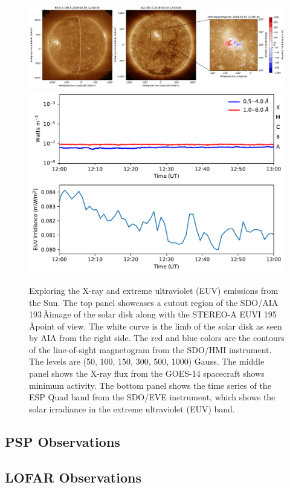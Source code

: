 \begin{figure}[ht]
\centering
\includegraphics[width=\hsize]{chapter2/figs/aia_sta_cutout.pdf}
\includegraphics[width=12cm]{chapter2/figs/xrs_eve.pdf}
\caption{Exploring the X-ray and extreme ultraviolet (EUV) emissions from the Sun. The top panel showcases a cutout region of the SDO/AIA 193\,\AA image of the solar disk along with the STEREO-A EUVI 195\,\AA point of view. The white curve is the limb of the solar disk as seen by AIA from the right side. The red and blue colors are the contours of the line-of-sight magnetogram from the SDO/HMI instrument. The levels are (50, 100, 150, 300, 500, 1000) Gauss. The middle panel shows the X-ray flux from the GOES-14 spacecraft shows minimum activity. The bottom panel shows the time series of the ESP Quad band from the SDO/EVE instrument, which shows the solar irradiance in the extreme ultraviolet (EUV) band.}
\label{soldisk_xrs}
\end{figure}

\subsection{PSP Observations}

\subsection{LOFAR Observations}


